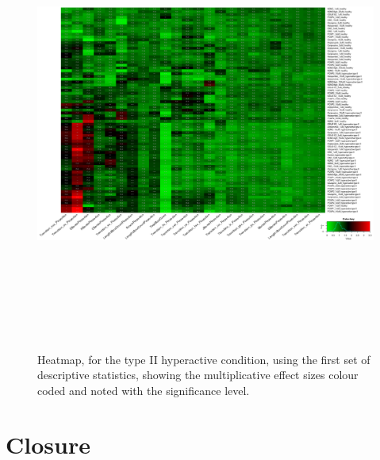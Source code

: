 \documentclass[a4paper,12pt]{article}
\begin{document}
\begin{figure}[h!]
\begin{center}
\includegraphics[width=16cm,height=15cm]{DarkPTZ_heatmap_all_DarkPTZ_B2MAP.png}
\caption{Heatmap, for the type II hyperactive condition, using the first set of descriptive statistics, showing the multiplicative effect sizes colour coded and noted with the significance level.}
\end{center}
\end{figure}
\newpage
\section{Closure}
\end{document}
